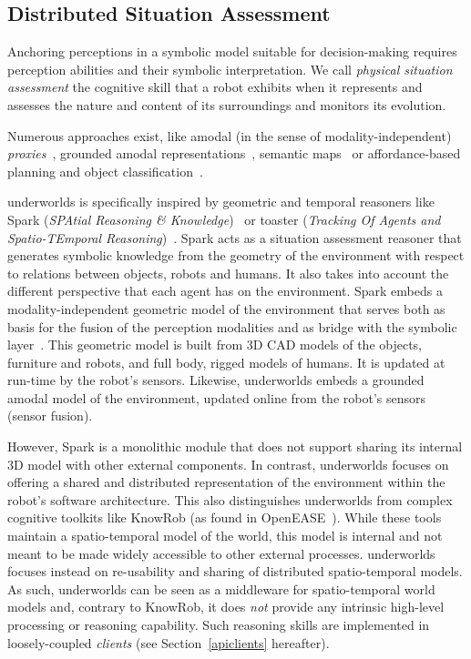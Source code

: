 \documentclass[letterpaper, 10pt, conference]{ieeeconf}
\newcommand{\uwds}{{\sc underworlds}\xspace}
\begin{document}
\subsection{Distributed Situation Assessment}

Anchoring perceptions in a symbolic model suitable for decision-making requires
perception abilities and their symbolic interpretation. We call \emph{physical
situation assessment} the cognitive skill that a robot exhibits when it
represents and assesses the nature and content of its surroundings and monitors
its evolution.

Numerous approaches exist, like amodal (in the sense of modality-independent)
\emph{proxies}~\cite{Jacobsson2008}, grounded amodal
representations~\cite{Mavridis2006}, semantic
maps~\cite{Nuechter2008, Galindo2008,Blodow2011} or affordance-based planning
and object classification~\cite{Lorken2008, Varadarajan2011}.


\uwds  is specifically inspired by geometric and temporal reasoners like {\sc
Spark} (\emph{SPAtial Reasoning \& Knowledge})~\cite{sisbot2011situation} or
{\sc toaster} (\emph{Tracking Of Agents and Spatio-TEmporal
Reasoning})~\cite{milliezframework2014}. {\sc Spark} acts as a situation
assessment reasoner that generates symbolic knowledge from the geometry of the
environment with respect to relations between objects, robots and humans. It
also takes into account the different perspective that each agent has on the
environment. {\sc Spark} embeds a modality-independent geometric model of the
environment that serves both as basis for the fusion of the perception
modalities and as bridge with the symbolic layer~\cite{lemaignan2016artificial}.
This geometric model is built from 3D CAD models of the objects, furniture and
robots, and full body, rigged models of humans. It is updated at run-time by the
robot's sensors.  Likewise, \uwds embeds a grounded amodal model of the
environment, updated online from the robot's sensors (sensor fusion).

However, {\sc Spark} is a monolithic module that does not support sharing its
internal 3D model with other external components. In contrast, \uwds focuses on
offering a shared and distributed representation of the environment within the
robot's software architecture. This also distinguishes \uwds from complex
cognitive toolkits like KnowRob (as found in OpenEASE~\cite{beetz2015open}).
While these tools maintain a spatio-temporal model of the world, this model is
internal and not meant to be made widely accessible to other external processes.
\uwds focuses instead on re-usability and sharing of distributed spatio-temporal
models.  As such, \uwds can be seen as a middleware for spatio-temporal world
models and, contrary to KnowRob, it does \emph{not} provide any intrinsic high-level
processing or reasoning capability. Such reasoning skills are implemented in
loosely-coupled \emph{clients} (see Section~\ref{apiclients} hereafter).
\end{document}
